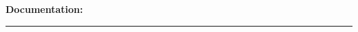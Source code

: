 \begin{questions}
\begin{parts}
\end{parts}

\vspace{1.5em}
\noindent\textbf{Documentation:} \rule[-2pt]{0.6\linewidth}{0.4pt}

\end{questions}
